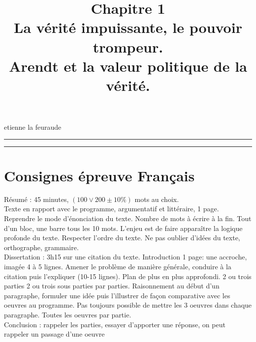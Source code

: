 \documentclass[12pt]{article}
\title{Chapitre 1\\\large La vérité impuissante, le pouvoir trompeur.\\Arendt et la valeur politique de la vérité.}
\date{}
\author{}
\begin{document}
\maketitle
\thispagestyle{fancy}
\begin{center}
    \LARGE{etienne la feuraude}
\end{center}
\hrule
\tableofcontents
\hrule
{}
\pagebreak
\section*{Consignes épreuve Français}
Résumé : 45 minutes, $(100 \vee 200 \pm10\%)$ mots au choix.\\
Texte en rapport avec le programme, argumentatif et littéraire, 1 page. Reprendre le mode d'énonciation du texte. Nombre de mots à écrire à la fin. Tout d'un bloc, une barre tous les 10 mots. L'enjeu est de faire apparaître la logique profonde du texte. Respecter l'ordre du texte. 
Ne pas oublier d'idées du texte, orthographe, grammaire.\\
Dissertation : 3h15 sur une citation du texte. Introduction 1 page: une accroche, imagée 4 à 5 lignes. Amener le problème de manière générale, conduire à la citation puis l'expliquer (10-15 lignes). Plan de plus en plus approfondi.
2 ou trois parties 2 ou trois sous parties par parties. Raisonnement au début d'un paragraphe, formuler une idée puis l'illustrer de façon comparative avec les oeuvres au programme. Pas toujours possible de mettre les 3 oeuvres dans chaque paragraphe. Toutes les oeuvres par partie.\\
Conclusion : rappeler les parties, essayer d'apporter une réponse, on peut rappeler un passage d'une oeuvre 
\pagebreak
\end{document}
